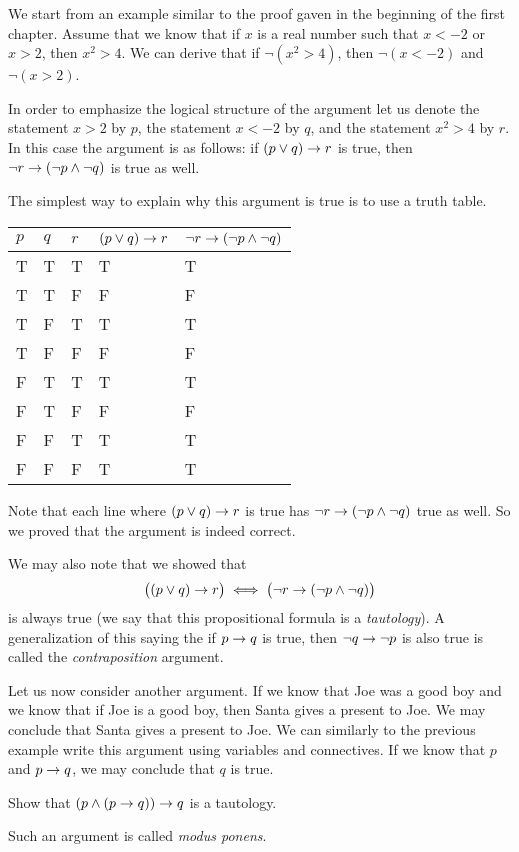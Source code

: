 We start from an example similar to
the proof gaven in the beginning of the first chapter. Assume that we know
that if $x$ is a real number such that $x < -2$ or $x > 2$, then $x^2 > 4$. We
can derive that if $\lnot (x^2 > 4)$, then $\lnot (x < -2)$ and $\lnot (x > 2)$.

In order to emphasize the logical structure of the argument let us denote
the statement $x > 2$ by $p$, the statement $x < -2$ by $q$, and the statement
$x^2 > 4$ by $r$. In this case the argument is as follows:
if $(p \lor q) \rightarrow r$ is true, then
$\lnot r \rightarrow (\lnot p \land \lnot q)$ is true as well.

The simplest way to explain why this argument is true is to use
a truth table.
\begin{center}
    \begin{tabular}{l l l l l}
        \toprule
        $p$ & $q$ & $r$ & $(p \lor q) \rightarrow r$ &
        $\lnot r \rightarrow (\lnot p \land \lnot q)$ \\
        \midrule
        T & T & T & T & T \\
        T & T & F & F & F \\
        T & F & T & T & T \\
        T & F & F & F & F \\
        F & T & T & T & T \\
        F & T & F & F & F \\
        F & F & T & T & T \\
        F & F & F & T & T \\
        \bottomrule
    \end{tabular}
\end{center}
Note that each line where $(p \lor q) \rightarrow r$ is true has
$\lnot r \rightarrow (\lnot p \land \lnot q)$ true as well. So we proved that
the argument is indeed correct.

We may also note that we showed that
\[
  \bigl((p \lor q) \rightarrow r\bigr) \iff
  \bigl(\lnot r \rightarrow (\lnot p \land \lnot q) \bigr)
\]
is always true (we say that this propositional formula is a
\emph{tautology}). A generalization of this saying the if $p \rightarrow q$ is
true, then $\lnot q \rightarrow \lnot p$ is also true is called the
\emph{contraposition} argument.

Let us now consider another argument. If we know that Joe was a good boy and we
know that if Joe is a good boy, then Santa gives a present to Joe. We may
conclude that Santa gives a present to Joe. We can similarly to the previous
example write this argument using variables and connectives.
If we know that $p$ and $p \rightarrow q$, we may conclude that $q$ is true.
\begin{exercise}
  Show that $(p \land (p \rightarrow q)) \rightarrow q$ is a tautology.
\end{exercise}
Such an argument is called \emph{modus ponens}.

